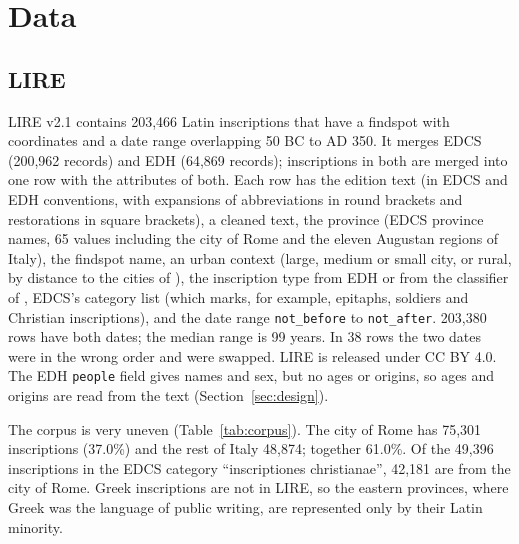 \documentclass[11pt,a4paper]{article}
\begin{document}
\section{Data}\label{sec:data}
\subsection{LIRE}
LIRE v2.1 \citep{kase2023lire} contains 203,466 Latin inscriptions that have a findspot with coordinates and a date range overlapping 50 BC to AD 350. It merges EDCS (200,962 records) and EDH (64,869 records); inscriptions in both are merged into one row with the attributes of both. Each row has the edition text (in EDCS and EDH conventions, with expansions of abbreviations in round brackets and restorations in square brackets), a cleaned text, the province (EDCS province names, 65 values including the city of Rome and the eleven Augustan regions of Italy), the findspot name, an urban context (large, medium or small city, or rural, by distance to the cities of \citet{hanson2016}), the inscription type from EDH or from the classifier of \citet{kase2021classifying}, EDCS's category list (which marks, for example, epitaphs, soldiers and Christian inscriptions), and the date range \texttt{not\_before} to \texttt{not\_after}. 203,380 rows have both dates; the median range is 99 years. In 38 rows the two dates were in the wrong order and were swapped. LIRE is released under CC BY 4.0. The EDH \texttt{people} field gives names and sex, but no ages or origins, so ages and origins are read from the text (Section~\ref{sec:design}).

The corpus is very uneven (Table~\ref{tab:corpus}). The city of Rome has 75,301 inscriptions (37.0\%) and the rest of Italy 48,874; together 61.0\%. Of the 49,396 inscriptions in the EDCS category ``inscriptiones christianae'', 42,181 are from the city of Rome. Greek inscriptions are not in LIRE, so the eastern provinces, where Greek was the language of public writing, are represented only by their Latin minority.
\end{document}
